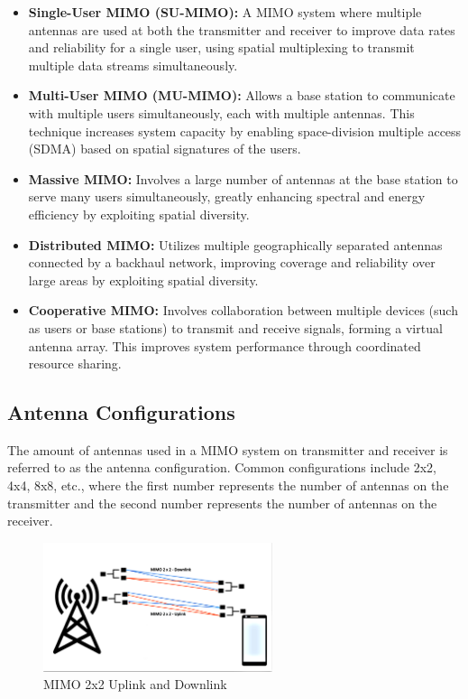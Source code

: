 \begin{itemize}
    \item \textbf{Single-User MIMO (SU-MIMO):} 
    A MIMO system where multiple antennas are used at both the transmitter and receiver to improve data rates and reliability for a single user, using spatial multiplexing to transmit multiple data streams simultaneously.
    
    \item \textbf{Multi-User MIMO (MU-MIMO):} 
    Allows a base station to communicate with multiple users simultaneously, each with multiple antennas. This technique increases system capacity by enabling space-division multiple access (SDMA) based on spatial signatures of the users.
    
    \item \textbf{Massive MIMO:} 
    Involves a large number of antennas at the base station to serve many users simultaneously, greatly enhancing spectral and energy efficiency by exploiting spatial diversity.
    
    \item \textbf{Distributed MIMO:} 
    Utilizes multiple geographically separated antennas connected by a backhaul network, improving coverage and reliability over large areas by exploiting spatial diversity.
    
    \item \textbf{Cooperative MIMO:} 
    Involves collaboration between multiple devices (such as users or base stations) to transmit and receive signals, forming a virtual antenna array. This improves system performance through coordinated resource sharing.
\end{itemize}

\subsection{Antenna Configurations}

The amount of antennas used in a MIMO system on transmitter and receiver is referred to as the antenna configuration. 
Common configurations include 2x2, 4x4, 8x8, etc., where the first number represents the number of antennas on the transmitter and the second number represents the number of antennas on the receiver.
\begin{figure}[H]
	\centering
	\includegraphics[width=0.6\textwidth]{Figures/mimo2x2.png}
	\caption{MIMO 2x2 Uplink and Downlink} 
\end{figure}

